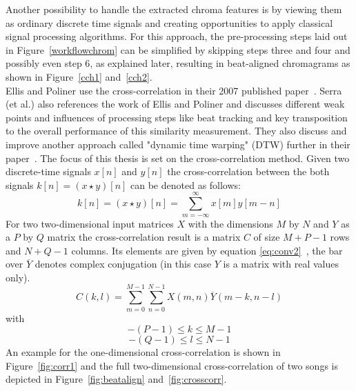 Another possibility to handle the extracted chroma features is by viewing them as ordinary discrete time signals and creating opportunities to apply classical signal processing algorithms. For this approach, the pre-processing steps laid out in Figure~\ref{workflowchrom} can be simplified by skipping steps three and four and possibly even step 6, as explained later, resulting in beat-aligned chromagrams as shown in Figure~\ref{cch1} and~\ref{cch2}.\\
Ellis and Poliner use the cross-correlation in their 2007 published paper~\cite{chroma3}. Serra (et al.) also references the work of Ellis and Poliner and discusses different weak points and influences of processing steps like beat tracking and key transposition to the overall performance of this similarity measurement. 
They also discuss and improve another approach called "dynamic time warping" (DTW) further in their paper~\cite{chroma2}. The focus of this thesis is set on the cross-correlation method. 
Given two discrete-time signals $x[n]$ and $y[n]$ the cross-correlation between the both signals $k[n] = (x \star y)[n]$ can be denoted as follows:
\begin{equation} \label{eq:conv1}
k[n] = (x \star y)[n] = \sum_{m = -\infty}^{\infty}{x[m] y[m - n]} 
\end{equation}
For two two-dimensional input matrices $X$ with the dimensions $M$ by $N$ and $Y$ as a $P$ by $Q$ matrix the cross-correlation result is a matrix $C$ of size $M + P - 1$ rows and $N + Q - 1$ columns. Its elements are given by equation \eqref{eq:conv2}~\cite{mathcorr}, the bar over $\overline{Y}$ denotes complex conjugation (in this case $Y$ is a matrix with real values only). 
\begin{equation} \label{eq:conv2}
C(k, l) = \sum_{m = 0}^{M - 1}{\sum_{n = 0}^{N - 1}{X(m, n)\overline{Y}(m - k, n - l)}}
\end{equation}
with 
\begin{equation} \label{eq:conv3}
-(P - 1) \leq k \leq M - 1
\end{equation}
\begin{equation} \label{eq:conv4}
-(Q - 1) \leq l \leq N - 1
\end{equation}
An example for the one-dimensional cross-correlation is shown in Figure~\ref{fig:corr1} and the full two-dimensional cross-correlation of two songs is depicted in Figure~\ref{fig:beatalign} and~\ref{fig:crosscorr}.
